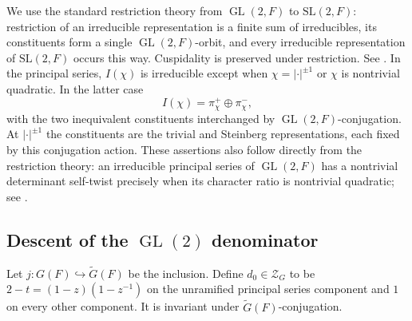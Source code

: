 \documentclass[11pt,a4paper]{amsart}
\newcommand{\mcZ}{\mathcal Z}
\theoremstyle{definition}
\theoremstyle{remark}
\DeclareMathOperator{\GL}{GL}
\begin{document}
We use the standard restriction theory from $\GL(2,F)$ to
$\mathrm{SL}(2,F)$: restriction of an irreducible representation
is a finite sum of irreducibles, its constituents form a single
$\GL(2,F)$-orbit, and every irreducible representation of
$\mathrm{SL}(2,F)$ occurs this way. Cuspidality is preserved
under restriction. See \cite[Section 2 and Theorem 3.1]{Tadic}.
In the principal series, $I(\chi)$ is irreducible except when
$\chi=|\cdot|^{\pm1}$ or $\chi$ is nontrivial quadratic.
In the latter case
$$
 I(\chi)=\pi_\chi^+\oplus\pi_\chi^-,
$$
with the two inequivalent constituents interchanged by
$\GL(2,F)$-conjugation. At $|\cdot|^{\pm1}$ the constituents are
the trivial and Steinberg representations, each fixed by this
conjugation action. These assertions also follow directly from the
restriction theory: an irreducible principal series of $\GL(2,F)$
has a nontrivial determinant self-twist precisely when its character
ratio is nontrivial quadratic; see \cite[Sections 2--3]{Tadic}.

\subsection{Descent of the \texorpdfstring{$\GL(2)$}{GL(2)} denominator}
Let $j:G(F)\hookrightarrow\widetilde G(F)$ be the inclusion. Define
$d_0\in\mcZ_G$ to be $2-t=(1-z)(1-z^{-1})$ on the unramified
principal series component and $1$ on every other component.
It is invariant under $\widetilde G(F)$-conjugation.
\end{document}
